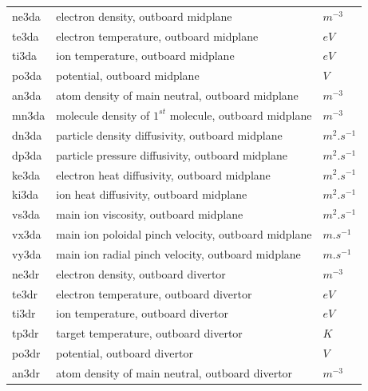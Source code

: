 \documentclass[a4paper,10pt]{report}
\begin{document}
\begin{center}
\begin{longtable}{|l|l|l|}
ne3da \index{ne3da}\index{b2time.nc, ne3da} & electron density, outboard midplane & $m^{-3}$ \\
te3da \index{te3da}\index{b2time.nc, te3da} & electron temperature, outboard midplane & $eV$ \\
ti3da \index{ti3da}\index{b2time.nc, ti3da} & ion temperature, outboard midplane & $eV$ \\
po3da \index{po3da}\index{b2time.nc, po3da} & potential, outboard midplane & $V $ \\
an3da \index{an3da}\index{b2time.nc, an3da} & atom density of main neutral, outboard midplane & $m^{-3}$ \\
mn3da \index{mn3da}\index{b2time.nc, mn3da} & molecule density of $1^{st}$ molecule, outboard midplane & $m^{-3}$ \\
dn3da \index{dn3da}\index{b2time.nc, dn3da} & particle density diffusivity, outboard midplane & $m^2.s^{-1}$ \\
dp3da \index{dp3da}\index{b2time.nc, dp3da} & particle pressure diffusivity, outboard midplane & $m^2.s^{-1}$ \\
ke3da \index{ke3da}\index{b2time.nc, ke3da} & electron heat diffusivity, outboard midplane & $m^2.s^{-1}$ \\
ki3da \index{ki3da}\index{b2time.nc, ki3da} & ion heat diffusivity, outboard midplane & $m^2.s^{-1}$ \\
vs3da \index{vs3da}\index{b2time.nc, vs3da} & main ion viscosity, outboard midplane & $m^2.s^{-1}$ \\
vx3da \index{vx3da}\index{b2time.nc, vx3da} & main ion poloidal pinch velocity, outboard midplane & $m.s^{-1}$ \\
vy3da \index{vy3da}\index{b2time.nc, vy3da} & main ion radial pinch velocity, outboard midplane & $m.s^{-1}$ \\
ne3dr \index{ne3dr}\index{b2time.nc, ne3dr} & electron density, outboard divertor & $m^{-3}$ \\
te3dr \index{te3dr}\index{b2time.nc, te3dr} & electron temperature, outboard divertor & $eV$ \\
ti3dr \index{ti3dr}\index{b2time.nc, ti3dr} & ion temperature, outboard divertor & $eV$ \\
tp3dr \index{tp3dr}\index{b2time.nc, tp3dr} & target temperature, outboard divertor & $K $ \\
po3dr \index{po3dr}\index{b2time.nc, po3dr} & potential, outboard divertor & $V $ \\
an3dr \index{an3dr}\index{b2time.nc, an3dr} & atom density of main neutral, outboard divertor & $m^{-3}$ \\

\end{longtable}
\end{center}
\end{document}

